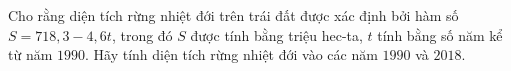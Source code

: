 \begin{ex}
Cho rằng diện tích rừng nhiệt đới trên trái đất được xác định bởi hàm số $S=718{,}3-4{,}6t$, trong đó $S$ được tính bằng triệu hec-ta, $t$ tính bằng số năm kể từ năm $1990$. Hãy tính diện tích rừng nhiệt đới vào các năm $1990$ và $2018$.
\end{ex}
